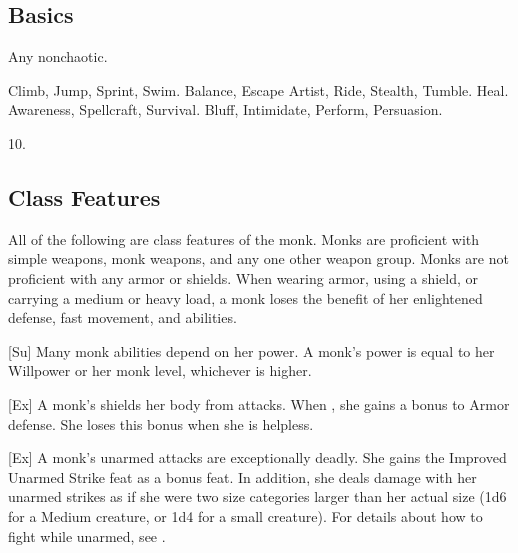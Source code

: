 \subsection{Basics}

 Any nonchaotic.

 Climb, Jump, Sprint, Swim.
 Balance, Escape Artist, Ride, Stealth, Tumble.
 Heal.
 Awareness, Spellcraft, Survival.
 Bluff, Intimidate, Perform, Persuasion.

 10.

\subsection{Class Features}
All of the following are class features of the monk.
Monks are proficient with simple weapons, monk weapons, and any one other weapon group.
Monks are not proficient with any armor or shields.
When wearing armor, using a shield, or carrying a medium or heavy load, a monk loses the benefit of her enlightened defense, fast movement, and \ki abilities.

[Su]
Many monk abilities depend on her \ki power.
A monk's \ki power is equal to her Willpower or her monk level, whichever is higher.

[Ex]
A monk's \ki shields her body from attacks.
When \monkunencumbered, she gains a  bonus to Armor defense.
She loses this bonus when she is helpless.

\begin{comment}  %
\cf{Mnk}{Ki Ward}[Ex]
When \monkunencumbered, a monk gains a \plus1 armor bonus to AC at 2nd level.
This bonus increases by 1 for every two monk levels thereafter (\plus2 at 4th, \plus3 at 6th, etc.).

\par The monk loses this bonus when she is
immobilized or helpless, when she wears any armor, when she carries a shield, or when she carries a medium or heavy load.
\end{comment}

[Ex]
A monk's unarmed attacks are exceptionally deadly.
She gains the Improved Unarmed Strike feat as a bonus feat.
In addition, she deals damage with her unarmed strikes as if she were two size categories larger than her actual size (1d6 for a Medium creature, or 1d4 for a small creature).
For details about how to fight while unarmed, see .

